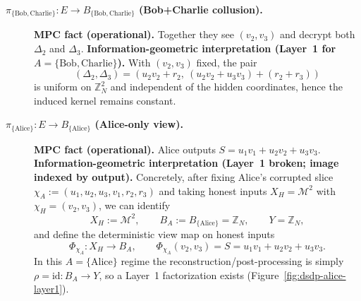 \documentclass[11pt,a4paper]{article}
\theoremstyle{definition}
\theoremstyle{plain}
\newcommand{\Z}{\mathbb{Z}}
\begin{document}
\begin{description}
    \item[\textbf{$\pi_{\{\mathrm{Bob},\mathrm{Charlie}\}}:E\to B_{\{\mathrm{Bob},\mathrm{Charlie}\}}$ (Bob+Charlie collusion).}]
    \textbf{MPC fact (operational).} Together they see $(v_2,v_3)$ and decrypt both $\Delta_2$ and $\Delta_3$.
    \textbf{Information-geometric interpretation (Layer~1 for $A=\{\mathrm{Bob},\mathrm{Charlie}\}$).}
    With $(v_2,v_3)$ fixed, the pair
    \[
    (\Delta_2,\Delta_3)=(u_2v_2+r_2,\ (u_2v_2+u_3v_3)+(r_2+r_3))
    \]
    is uniform on $\Z_N^2$ and independent of the hidden coordinates, hence the induced kernel remains constant.

    \item[\textbf{$\pi_{\{\mathrm{Alice}\}}:E\to B_{\{\mathrm{Alice}\}}$ (Alice-only view).}]
    \textbf{MPC fact (operational).} Alice outputs $S=u_1v_1+u_2v_2+u_3v_3$.
    \textbf{Information-geometric interpretation (Layer~1 broken; image indexed by output).}
    Concretely, after fixing Alice's corrupted slice $\chi_A:=(u_1,u_2,u_3,v_1,r_2,r_3)$ and taking honest inputs $X_H=\mathcal{M}^2$ with $\chi_H=(v_2,v_3)$, we can identify
    \[
    X_H:=\mathcal{M}^2,\qquad B_A:=B_{\{\mathrm{Alice}\}}=\Z_N,\qquad Y=\Z_N,
    \]
    and define the deterministic view map on honest inputs
    \[
    \Phi_{\chi_A}:X_H\to B_A,\qquad \Phi_{\chi_A}(v_2,v_3)=S=u_1v_1+u_2v_2+u_3v_3.
    \]
    In this $A=\{\mathrm{Alice}\}$ regime the reconstruction/post-processing is simply $\rho=\mathrm{id}:B_A\to Y$, so a Layer~1 factorization exists (Figure~\ref{fig:dsdp-alice-layer1}).


\end{description}
\end{document}

